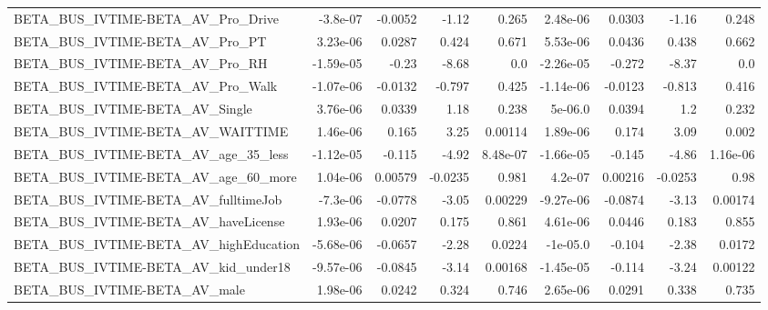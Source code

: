 \begin{tabular}{lrrrrrrrr}
BETA\_BUS\_IVTIME-BETA\_AV\_Pro\_Drive                  &    -3.8e-07 &      -0.0052 &     -1.12 &    0.265 &   2.48e-06 &      0.0303 &        -1.16 &         0.248 \\
BETA\_BUS\_IVTIME-BETA\_AV\_Pro\_PT                     &    3.23e-06 &       0.0287 &     0.424 &    0.671 &   5.53e-06 &      0.0436 &        0.438 &         0.662 \\
BETA\_BUS\_IVTIME-BETA\_AV\_Pro\_RH                     &   -1.59e-05 &        -0.23 &     -8.68 &      0.0 &  -2.26e-05 &      -0.272 &        -8.37 &           0.0 \\
BETA\_BUS\_IVTIME-BETA\_AV\_Pro\_Walk                   &   -1.07e-06 &      -0.0132 &    -0.797 &    0.425 &  -1.14e-06 &     -0.0123 &       -0.813 &         0.416 \\
BETA\_BUS\_IVTIME-BETA\_AV\_Single                     &    3.76e-06 &       0.0339 &      1.18 &    0.238 &    5e-06.0 &      0.0394 &          1.2 &         0.232 \\
BETA\_BUS\_IVTIME-BETA\_AV\_WAITTIME                   &    1.46e-06 &        0.165 &      3.25 &  0.00114 &   1.89e-06 &       0.174 &         3.09 &         0.002 \\
BETA\_BUS\_IVTIME-BETA\_AV\_age\_35\_less                &   -1.12e-05 &       -0.115 &     -4.92 & 8.48e-07 &  -1.66e-05 &      -0.145 &        -4.86 &      1.16e-06 \\
BETA\_BUS\_IVTIME-BETA\_AV\_age\_60\_more                &    1.04e-06 &      0.00579 &   -0.0235 &    0.981 &    4.2e-07 &     0.00216 &      -0.0253 &          0.98 \\
BETA\_BUS\_IVTIME-BETA\_AV\_fulltimeJob                &    -7.3e-06 &      -0.0778 &     -3.05 &  0.00229 &  -9.27e-06 &     -0.0874 &        -3.13 &       0.00174 \\
BETA\_BUS\_IVTIME-BETA\_AV\_haveLicense                &    1.93e-06 &       0.0207 &     0.175 &    0.861 &   4.61e-06 &      0.0446 &        0.183 &         0.855 \\
BETA\_BUS\_IVTIME-BETA\_AV\_highEducation              &   -5.68e-06 &      -0.0657 &     -2.28 &   0.0224 &   -1e-05.0 &      -0.104 &        -2.38 &        0.0172 \\
BETA\_BUS\_IVTIME-BETA\_AV\_kid\_under18                &   -9.57e-06 &      -0.0845 &     -3.14 &  0.00168 &  -1.45e-05 &      -0.114 &        -3.24 &       0.00122 \\
BETA\_BUS\_IVTIME-BETA\_AV\_male                       &    1.98e-06 &       0.0242 &     0.324 &    0.746 &   2.65e-06 &      0.0291 &        0.338 &         0.735 \\

\end{tabular}
